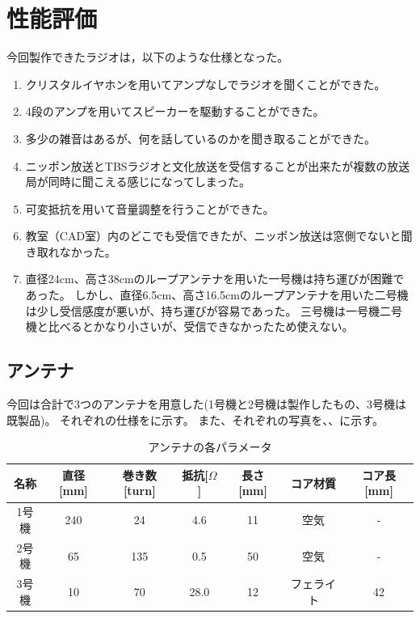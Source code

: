 \documentclass[report.tex]{subfiles}
\begin{document}
\section{性能評価}

今回製作できたラジオは，以下のような仕様となった。

\begin{enumerate}
	\item クリスタルイヤホンを用いてアンプなしでラジオを聞くことができた。
	\item 4段のアンプを用いてスピーカーを駆動することができた。
	\item 多少の雑音はあるが、何を話しているのかを聞き取ることができた。
	\item ニッポン放送とTBSラジオと文化放送を受信することが出来たが複数の放送局が同時に聞こえる感じになってしまった。
	\item 可変抵抗を用いて音量調整を行うことができた。
	\item 教室（CAD室）内のどこでも受信できたが、ニッポン放送は窓側でないと聞き取れなかった。
	\item 直径24cm、高さ38cmのループアンテナを用いた一号機は持ち運びが困難であった。
	      しかし、直径6.5cm、高さ16.5cmのループアンテナを用いた二号機は少し受信感度が悪いが、持ち運びが容易であった。
	      三号機は一号機二号機と比べるとかなり小さいが、受信できなかったため使えない。
\end{enumerate}

\subsection{アンテナ}

今回は合計で3つのアンテナを用意した(1号機と2号機は製作したもの、3号機は既製品)。
それぞれの仕様をに示す。
また、それぞれの写真を、、に示す。

\begin{table}[h]
	\centering
	\caption{アンテナの各パラメータ}
	\label{tab:ant}
	\begin{tabular}{ccccccc} \hline
		名称  & 直径[mm] & 巻き数[turn] & 抵抗[\(\Omega\)] & 長さ[mm] & コア材質  & コア長[mm] \\ \hline
		1号機 & 240    & 24        & 4.6            & 11     & 空気    & -       \\
		2号機 & 65     & 135       & 0.5            & 50     & 空気    & -       \\
		3号機 & 10     & 70        & 28.0           & 12     & フェライト & 42      \\ \hline
	\end{tabular}
\end{table}
\end{document}
